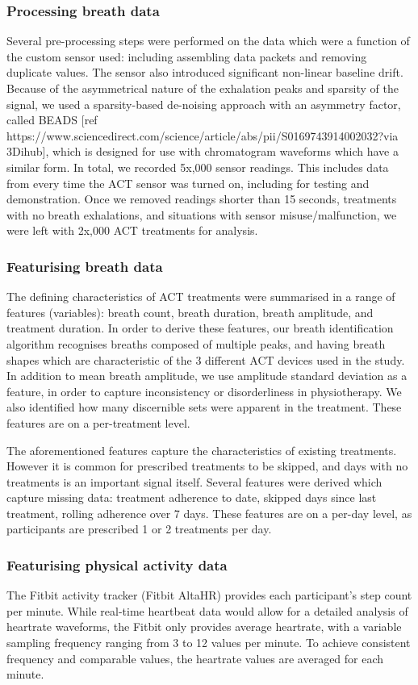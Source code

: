 \documentclass{article}
\begin{document}
\subsubsection{Processing breath data}
Several pre-processing steps were performed on the data which were a function of the custom sensor used: including assembling data packets and removing duplicate values. The sensor also introduced significant non-linear baseline drift. Because of the asymmetrical nature of the exhalation peaks and sparsity of the signal, we used a sparsity-based de-noising approach with an asymmetry factor, called BEADS [ref https://www.sciencedirect.com/science/article/abs/pii/S0169743914002032?via 3Dihub], which is designed for use with chromatogram waveforms which have a similar form. 
In total, we recorded 5x,000 sensor readings. This includes data from every time the ACT sensor was turned on, including for testing and demonstration. Once we removed readings shorter than 15 seconds, treatments with no breath exhalations, and situations with sensor misuse/malfunction, we were left with 2x,000 ACT treatments for analysis. 

\subsubsection{Featurising breath data}
The defining characteristics of ACT treatments were summarised in a range of features (variables): breath count, breath duration, breath amplitude, and treatment duration. In order to derive these features, our breath identification algorithm recognises breaths composed of multiple peaks, and having breath shapes which are characteristic of the 3 different ACT devices used in the study. In addition to mean breath amplitude, we use amplitude standard deviation as a feature, in order to capture inconsistency or disorderliness in physiotherapy. We also identified how many discernible sets were apparent in the treatment. These features are on a per-treatment level. 

The aforementioned features capture the characteristics of existing treatments. However it is common for prescribed treatments to be skipped, and days with no treatments is an important signal itself. Several features were derived which capture missing data: treatment adherence to date, skipped days since last treatment, rolling adherence over 7 days. These features are on a per-day level, as participants are prescribed 1 or 2 treatments per day. 


\subsubsection{Featurising physical activity data}
The Fitbit activity tracker (Fitbit AltaHR) provides each participant’s step count per minute. While real-time heartbeat data would allow for a detailed analysis of heartrate waveforms, the Fitbit only provides average heartrate, with a variable sampling frequency ranging from 3 to 12 values per minute. To achieve consistent frequency and comparable values, the heartrate values are averaged for each minute.   
\end{document}

